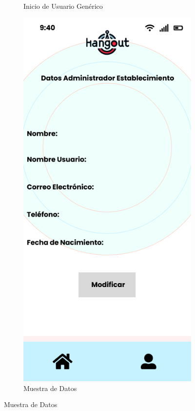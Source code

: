 \begin{figure}[H]
\begin{subfigure}{0.45\textwidth}
        \caption{Inicio de Usuario Genérico}
        \label{fig:img5}
    \end{subfigure}%
    \hfill
    \begin{subfigure}{0.45\textwidth}
        \centering
        \includegraphics[width=\linewidth]{imagenes/mockup6.png}
        \caption{Muestra de Datos}
        \label{fig:img6}
    \end{subfigure}
\end{figure}
\vspace*{\fill}